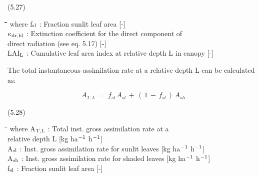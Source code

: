 
\strut\hfill (5.27)
\nwln
\begin{tabbing}
\hspace{1.27cm}\=\hspace{1.27cm}\=\hspace{1.27cm}\=\hspace{1.27cm}\=%
\hspace{1.27cm}\=\hspace{1.27cm}\=\hspace{1.27cm}\=\hspace{1.27cm}\=%
\hspace{1.27cm}\=\hspace{1.27cm}\=\kill
where f$_{{\rm sl}}$ : Fraction sunlit leaf area        [-]\\
$\kappa$$_{{\rm dr,bl}}$ : Extinction coefficient for the direct component of\\
   direct radiation (see eq. 5.17)        [-]\\
LAI$_{{\rm L}}$ : Cumulative leaf area index at relative depth L in canopy        [-]
\end{tabbing}

      

The total instantaneous assimilation rate at a relative depth L can be calculated as:

\begin{displaymath}
A _{T,L} ~=~ f _{sl} \, A _{sl} \, +\, (\, 1\, -\, f _{sl} \, )\, A _{sh} 
\end{displaymath}

 
\strut\hfill (5.28)
\nwln
\begin{tabbing}
\hspace{1.27cm}\=\hspace{1.27cm}\=\hspace{1.27cm}\=\hspace{1.27cm}\=%
\hspace{1.27cm}\=\hspace{1.27cm}\=\hspace{1.27cm}\=\hspace{1.27cm}\=%
\hspace{1.27cm}\=\hspace{1.27cm}\=\kill
where A$_{{\rm T,L}}$ : Total inst. gross assimilation rate at a\\
   relative depth L        [kg ha$^{{\rm -1}}$ h$^{{\rm -1}}$]\\
A$_{{\rm sl}}$ : Inst. gross assimilation rate for sunlit leaves        [kg ha$^{{\rm -1}}$ h$^{{\rm -1}}$]\\
A$_{{\rm sh}}$ : Inst. gross assimilation rate for shaded leaves        [kg ha$^{{\rm -1}}$ h$^{{\rm -1}}$]\\
f$_{{\rm sl}}$ : Fraction sunlit leaf area        [-]
\end{tabbing}



